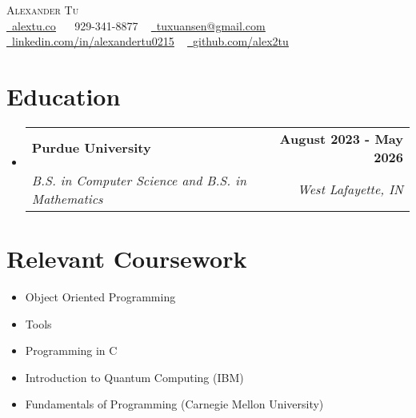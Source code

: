 \documentclass[letterpaper,11pt]{article}
\makeatletter
\newcommand{\resumeSubheading}[4]{
  \vspace{-2pt}\item
    \begin{tabular*}{1.0\textwidth}[t]{l@{\extracolsep{\fill}}r}
      \textbf{#1} & \textbf{\small #2} \\
      \textit{\small#3} & \textit{\small #4} \\
    \end{tabular*}\vspace{-7pt}
}
\newcommand{\resumeSubHeadingListStart}{\begin{itemize}[leftmargin=0.0in, label={}]}
\newcommand{\resumeSubHeadingListEnd}{\end{itemize}}
\makeatother
\begin{document}

\begin{center}
    {\Huge \scshape Alexander Tu} \\ \vspace{1pt}
    \href{https://alextu.co/}{\raisebox{-0.2\height}\faUser\ \underline{alextu.co}}  ~
    \small \raisebox{-0.1\height}\faPhone\ 929-341-8877 ~ \href{mailto:tuxuansen@gmail.com}{\raisebox{-0.2\height}\faEnvelope\  \underline{tuxuansen@gmail.com}} ~ 
    \href{https://linkedin.com/in/alexandertu0215/}{\raisebox{-0.2\height}\faLinkedin\ \underline{linkedin.com/in/alexandertu0215}}  ~
    \href{https://github.com/alex2tu}{\raisebox{-0.2\height}\faGithub\ \underline{github.com/alex2tu}}
    \vspace{-8pt}
\end{center}


\section{Education}
  \resumeSubHeadingListStart
    \resumeSubheading
      {Purdue University}{August 2023 - May 2026}
      {B.S. in Computer Science and B.S. in Mathematics}{West Lafayette, IN}
  \resumeSubHeadingListEnd

\section{Relevant Coursework}
        \begin{multicols}{2}
            \begin{itemize}[itemsep=-4pt, parsep=3pt]
                \item\small Object Oriented Programming
                \item Tools
                \item Programming in C
                \item Introduction to Quantum Computing (IBM)
                \item Fundamentals of Programming (Carnegie Mellon University)
            \end{itemize}
        \end{multicols}
        \vspace*{2.0\multicolsep}
\end{document}
